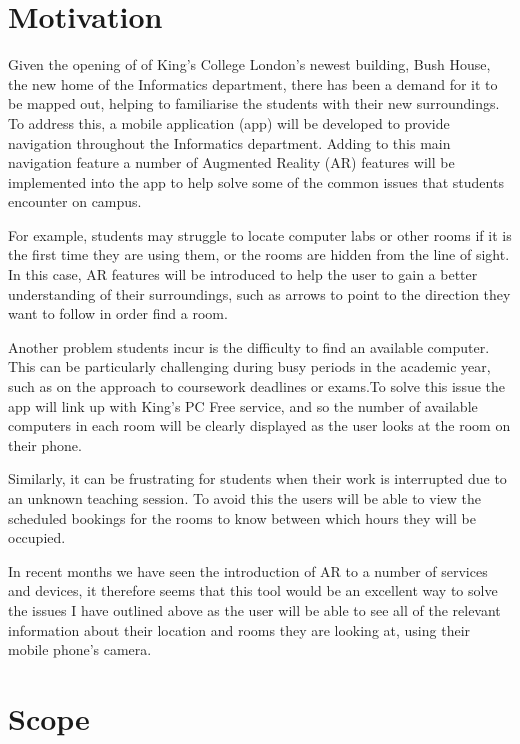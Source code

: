 \section{Motivation}
\label{sec:motivation}

Given the opening of of King's College London's newest building, Bush House, the new home of the Informatics department, there has been a demand for it to be mapped out, helping to familiarise the students with their new surroundings. To address this, a mobile application (app) will be developed to provide navigation throughout the Informatics department. Adding to this main navigation feature a number of Augmented Reality (AR) features will be implemented into the app to help solve some of the common issues that students encounter on campus.

For example, students may struggle to locate computer labs or other rooms if it is the first time they are using them, or the rooms are hidden from the line of sight. In this case, AR features will be introduced to help the user to gain a better understanding of their surroundings, such as arrows to point to the direction they want to follow in order find a room.

Another problem students incur is the difficulty to find an available computer. This can be particularly challenging during busy periods in the academic year, such as on the approach to coursework deadlines or exams.To solve this issue the app will link up with King's PC Free service, and so the number of available computers in each room will be clearly displayed as the user looks at the room on their phone.

Similarly, it can be frustrating for students when their work is interrupted due to an unknown teaching session.  To avoid this the users will be able to view the scheduled bookings for the rooms to know between which hours they will be occupied.

In recent months we have seen the introduction of AR to a number of services and devices, it therefore seems that this tool would be an excellent way to solve the issues I have outlined above as the user will be able to see all of the relevant information about their location and rooms they are looking at, using their mobile phone's camera.

\section{Scope}
\label{sec:scope}

